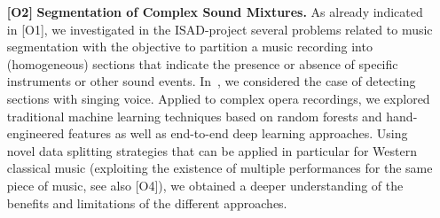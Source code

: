\documentclass[11pt,a4paper]{article}
\def\PN{\mathrm{ISAD}}
\newenvironment{itemizePacked}{
\begin{itemize}
  \setlength{\itemsep}{1pt}
  \setlength{\parskip}{0pt}
  \setlength{\parsep}{0pt}
  \renewcommand{\labelitemi}{$\bullet$}
}{\end{itemize}}
\newcommand{\jakob}[1]{{\color{magenta} #1}}
\theoremstyle{plain} \newtheorem{define}{Definition}[section]
\begin{document}
\begin{enumerate}
\item [\textbf{[O2]}] \textbf{Segmentation of Complex Sound Mixtures.}
%
%
%
As already indicated in [O1], we investigated in the $\PN$-project several problems related to music segmentation with the objective to partition a  music recording into (homogeneous) sections that indicate the presence or absence of specific instruments or other sound events. 
%
In~\cite{KrauseMW21_OperaSingingActivity_Electronics,MimilakisWAAM19_SingingVDetWagner_MML}, we considered the case of detecting sections with singing voice. Applied to complex opera recordings, we explored traditional machine learning techniques based on random forests and hand-engineered features as well as end-to-end deep learning approaches. Using novel data splitting strategies that can be applied in particular for Western classical music (exploiting the existence of multiple performances for the same piece of music, see also [O4]), we obtained a deeper understanding of the benefits and limitations of the different approaches. 

\end{enumerate}
\end{document}
